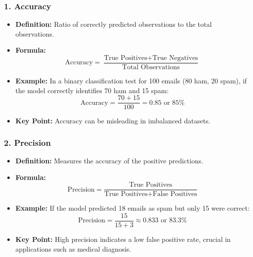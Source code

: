 \documentclass[aspectratio=169]{beamer}
\begin{document}
\begin{frame}[fragile]
    \frametitle{1. Accuracy}
    \begin{itemize}
        \item \textbf{Definition:} Ratio of correctly predicted observations to the total observations.
        \item \textbf{Formula:}
        \begin{equation}
        \text{Accuracy} = \frac{\text{True Positives} + \text{True Negatives}}{\text{Total Observations}}
        \end{equation}
        \item \textbf{Example:} In a binary classification test for 100 emails (80 ham, 20 spam), if the model correctly identifies 70 ham and 15 spam:
        \begin{equation}
        \text{Accuracy} = \frac{70 + 15}{100} = 0.85 \text{ or } 85\%
        \end{equation}
        \item \textbf{Key Point:} Accuracy can be misleading in imbalanced datasets.
    \end{itemize}
\end{frame}

\begin{frame}[fragile]
    \frametitle{2. Precision}
    \begin{itemize}
        \item \textbf{Definition:} Measures the accuracy of the positive predictions.
        \item \textbf{Formula:}
        \begin{equation}
        \text{Precision} = \frac{\text{True Positives}}{\text{True Positives} + \text{False Positives}}
        \end{equation}
        \item \textbf{Example:} If the model predicted 18 emails as spam but only 15 were correct:
        \begin{equation}
        \text{Precision} = \frac{15}{15 + 3} \approx 0.833 \text{ or } 83.3\%
        \end{equation}
        \item \textbf{Key Point:} High precision indicates a low false positive rate, crucial in applications such as medical diagnosis.
    \end{itemize}
\end{frame}
\end{document}
